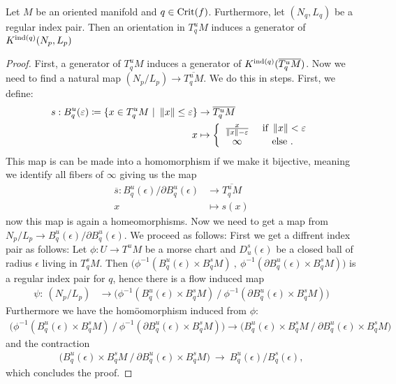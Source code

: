 \begin{lemma}
    Let $M$ be an oriented manifold and $q\in \mathrm{Crit}(f)$. Furthermore, let $(N_q,L_q)$ be a regular index pair. Then an orientation in $T^u_qM$ induces a generator of $K^{\mathrm{ind}(q)}(N_p,L_p)$
\end{lemma}
\begin{proof}
   First, a generator of $T^u_qM$ induces a generator of $K^{\mathrm{ind}(q)}(\overline{T^u_qM})$. Now we need to find a natural map $  (N_p\slash L_p) \to \overline{T^u_qM}$. We do this in steps. 
   First, we define:
   \begin{align*}
       s: B^u_q(\varepsilon)\coloneq \{x\in T^u_qM~|~\left\lVert x\right\rVert\leq \varepsilon\} 
                &\to  \overline{T^u_qM}\\
       x        &\mapsto \left\{\begin{array}{cc}
           \frac{x}{\left\lVert x\right\rVert-\varepsilon} &  \text{ if }\left\lVert x\right\rVert<\varepsilon\\
            \infty & \text{else .} 
       \end{array} \right.
   \end{align*} This map is can be made into a homomorphism if we make it bijective, meaning we identify all fibers of $\infty$ giving us the map 
   \begin{align*}
       \overline{s}:  B^u_q(\epsilon) \slash \partial  B^u_q(\epsilon)  &\to \overline{T^u_qM}\\
            x                                                           & \mapsto s(x)        
   \end{align*} now this map is again a homeomorphisms. Now we need to get a map from $N_p\slash L_p \to B^u_q(\epsilon) \slash \partial  B^u_q(\epsilon)$. We proceed as follows: First we get a diffrent index pair as follows: Let $\phi:U\to T^uM$ be a morse chart and $D^s_u(\epsilon)$ be a closed ball of radius $ \epsilon$ living in $T^s_qM$. Then $\big(\phi^{-1}(B^u_q(\epsilon)\times B^s_qM)~,~\phi^{-1}(\partial B^u_q(\epsilon)\times B^s_qM) \big)$ is a regular index pair for $q$, hence there is a flow induced map \begin{align*}
       \psi: ~(N_p\slash L_p)    &\to  \big(\phi^{-1}(B^u_q(\epsilon)\times B^s_qM)~\big/~\phi^{-1}(\partial B^u_q(\epsilon)\times B^s_qM) \big)
   \end{align*} Furthermore we have the homöomorphism induced from $\phi$:
   \begin{align*}
       \big(\phi^{-1}(B^u_q(\epsilon)\times B^s_qM)~\big/~\phi^{-1}(\partial B^u_q(\epsilon)\times B^s_qM) \big) \to \big(B^u_q(\epsilon)\times B^s_qM~\big/~\partial B^u_q(\epsilon)\times B^s_qM \big)
   \end{align*}
   and the contraction 
   \begin{align*}
       \big(B^u_q(\epsilon)\times B^s_qM~\big/~\partial B^u_q(\epsilon)\times B^s_qM \big)~\to ~ B^u_q(\epsilon)\slash B^s_q(\epsilon),
   \end{align*} which concludes the proof. 
   

\end{proof}
